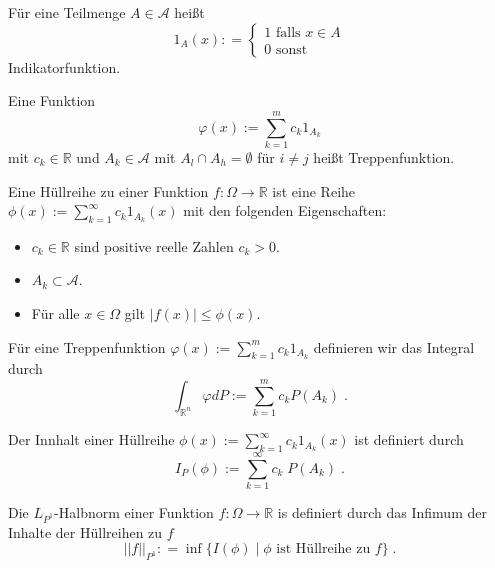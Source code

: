 \begin{Definition}
Für eine Teilmenge $A \in \mathcal{A}$ heißt
$$ 1_A (x): = \begin{cases} 1 \text{  falls }   x \in A  \\  0  \text{  sonst}  \end{cases}$$
Indikatorfunktion.
\end{Definition}

\begin{Definition}
Eine Funktion 
$$ \varphi(x) := \sum_{k=1}^m c_k 1_{A_k}$$ mit $c_k \in \mathbb{R}$ und $A_k \in \mathcal{A}$ mit $A_l \cap A_h = \emptyset$ für $i \neq j$
heißt Treppenfunktion.
\end{Definition}





\begin{Definition}
Eine Hüllreihe zu einer Funktion $f :\Omega \to \mathbb{R}$ ist eine Reihe $\phi(x):= \sum_{k=1}^{\infty} c_k  1_{A_k} (x)$ mit den folgenden Eigenschaften:
\begin{itemize}
\item $c_k \in \mathbb{R}$ sind positive reelle Zahlen $c_k >0$.
\item $A_k \subset \mathcal{A}$.
\item Für alle $x \in \Omega$ gilt $|f(x) | \leq \phi(x)$.
\end{itemize}
\end{Definition}

 
\begin{Definition}
Für eine Treppenfunktion $ \varphi(x) := \sum_{k=1}^m c_k 1_{A_k}$ definieren wir das Integral durch
$$\int_{\mathbb{R}^n} \varphi dP := \sum_{k =1}^m  c_k P(A_k) \; . $$
\end{Definition}


\begin{Definition}
Der Innhalt einer Hüllreihe $\phi(x):= \sum_{k=1}^{\infty} c_k  1_{A_k} (x)$ ist definiert durch 
$$I_P (\phi) := \sum_{k=1}^{\infty} c_k \;  P(A_k) \; .$$
\end{Definition}


\begin{Definition}
Die $L_{P^1}$-Halbnorm einer Funktion $f : \Omega\to \mathbb{R}$ is definiert durch das Infimum der Inhalte der Hüllreihen zu $f$
$$ || f ||_{P^1} : = \inf  \biggl \{   I(\phi) \; | \; \phi  \text{ ist Hüllreihe zu  }  f \biggr \} \; .$$
\end{Definition}



